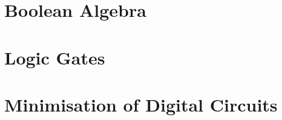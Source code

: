 \section{Boolean Algebra}
\label{sec:BooleanAlgebra}

\section{Logic Gates}
\label{sec:LogicGates}

\section{Minimisation of Digital Circuits}


\newpage
